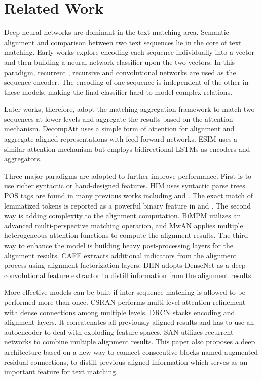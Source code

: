 \documentclass[11pt,a4paper]{article}
\begin{document}
\section{Related Work} \label{related}

Deep neural networks are dominant in the text matching area. 
Semantic alignment and comparison between two text sequences lie in the core of text matching. 
Early works explore encoding each sequence individually into a vector and then building a neural network classifier upon the two vectors. In this paradigm, recurrent \cite{snli}, recursive \cite{tai2015improved} and convolutional \cite{yu2014deep, tan2016improved} networks are used as the sequence encoder. The encoding of one sequence is independent of the other in these models, making the final classifier hard to model complex relations.

Later works, therefore, adopt the matching aggregation framework to match two sequences at lower levels and aggregate the results based on the attention mechanism. DecompAtt \cite{parikh2016decomposable} uses a simple form of attention for alignment and aggregate aligned representations with feed-forward networks. ESIM \cite{chen2017enhanced} uses a similar attention mechanism but employs bidirectional LSTMs as encoders and aggregators. 

Three major paradigms are adopted to further improve performance. First is to use richer syntactic or hand-designed features. HIM \cite{chen2017enhanced} uses syntactic parse trees. POS tags are found in many previous works including \citeauthor{tay2018compare}  and \citeauthor{gong2018natural} . The exact match of lemmatized tokens is reported as a powerful binary feature in \citeauthor{gong2018natural}  and \citeauthor{kim2018semantic} . 
The second way is adding complexity to the alignment computation. BiMPM \cite{wang2017bilateral} utilizes an advanced multi-perspective matching operation, and MwAN \cite{tan2018multiway} applies multiple heterogeneous attention functions to compute the alignment results. 
The third way to enhance the model is building heavy post-processing layers for the alignment results. CAFE \cite{tay2018compare} extracts additional indicators from the alignment process using alignment factorization layers. DIIN \cite{gong2018natural} adopts DenseNet as a deep convolutional feature extractor to distill information from the alignment results. 

More effective models can be built if inter-sequence matching is allowed to be performed more than once. CSRAN \cite{tay2018co} performs multi-level attention refinement with dense connections among multiple levels. DRCN \cite{kim2018semantic} stacks encoding and alignment layers. It concatenates all previously aligned results and has to use an autoencoder to deal with exploding feature spaces. SAN \cite{liu2018stochastic} utilizes recurrent networks to combine multiple alignment results. This paper also proposes a deep architecture based on a new way to connect consecutive blocks named augmented residual connections, to distill previous aligned information which serves as an important feature for text matching.
\end{document}
